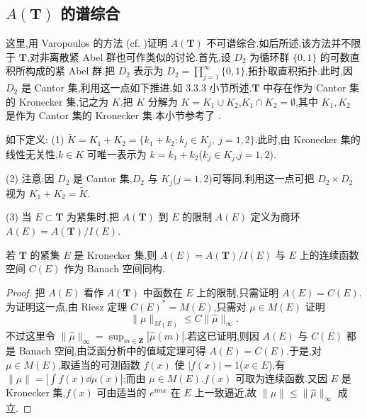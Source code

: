 \subsection{\texorpdfstring{$A(\mathbf{T})$ 的谱综合}{A(T) 的谱综合}}\label{sec:3.4.4}

这里,用 Varopoulos 的方法 \cite{ch3:52}(cf. \cite{ch3:23})证明 $A(\mathbf{T})$ 不可谱综合.如后所述,该方法并不限于 $\mathbf{T}$,对非离散紧 Abel 群也可作类似的讨论.首先,设 $D_{2}$ 为循环群 $\{0, 1\}$ 的可数直积所构成的紧 Abel 群.把 $D_{2}$ 表示为 $D_{2} = \prod_{j=1}^{\infty}\{0, 1\}$,拓扑取直积拓扑.此时,因 $D_{2}$ 是 Cantor 集,利用这一点如下推进.如 3.3.3 小节所述,$\mathbf{T}$ 中存在作为 Cantor 集的 Kronecker 集,记之为 $K$.把 $K$ 分解为 $K = K_{1} \cup K_{2}$,$K_{1} \cap K_{2} = \emptyset$,其中 $K_{1}, K_{2}$ 是作为 Cantor 集的 Kronecker 集.本小节参考了 \cite{ch3:23}.

\begin{definition}\label{def:3.4.9}
如下定义:
(1) $\widetilde{K} = K_{1} + K_{2} = \{k_{1} + k_{2}: k_{j} \in K_{j},\ j = 1, 2\}$.此时,由 Kronecker 集的线性无关性,$k \in K$ 可唯一表示为 $k = k_{1} + k_{2}$($k_{j} \in K_{j}$,$j = 1, 2$).

(2) 注意:因 $D_{2}$ 是 Cantor 集,$D_{2}$ 与 $K_{j}$($j = 1, 2$)可等同,利用这一点可把 $D_{2} \times D_{2}$ 视为 $K_{1} + K_{2} = \widetilde{K}$.

(3) 当 $E \subset \mathbf{T}$ 为紧集时,把 $A(\mathbf{T})$ 到 $E$ 的限制 $A(E)$ 定义为商环 $A(E) = A(\mathbf{T})/I(E)$.
\end{definition}

\begin{proposition}\label{prop:3.4.10}
若 $\mathbf{T}$ 的紧集 $E$ 是 Kronecker 集,则 $A(E) = A(\mathbf{T})/I(E)$ 与 $E$ 上的连续函数空间 $C(E)$ 作为 Banach 空间同构.
\end{proposition}

\begin{proof}
把 $A(E)$ 看作 $A(\mathbf{T})$ 中函数在 $E$ 上的限制,只需证明 $A(E) = C(E)$.为证明这一点,由 Riesz 定理 $C(E)^{*} = M(E)$,只需对 $\mu \in M(E)$ 证明
\begin{equation*}
\|\mu\|_{M(E)} \leq C\|\widehat{\mu}\|_{\infty}.
\end{equation*}
不过这里令 $\|\widehat{\mu}\|_{\infty} = \sup_{m \in \mathbf{Z}}|\widehat{\mu}(m)|$.若这已证明,则因 $A(E)$ 与 $C(E)$ 都是 Banach 空间,由泛函分析中的值域定理可得 $A(E) = C(E)$.于是,对 $\mu \in M(E)$,取适当的可测函数 $f(x)$ 使 $|f(x)| = 1$($x \in E$),有 $\|\mu\| = \left|\int f(x)\dd\mu(x)\right|$;而由 $\mu \in M(E)$,$f(x)$ 可取为连续函数.又因 $E$ 是 Kronecker 集,$f(x)$ 可由适当的 $e^{imx}$ 在 $E$ 上一致逼近,故 $\|\mu\| \leq \|\widehat{\mu}\|_{\infty}$ 成立.
\end{proof}

